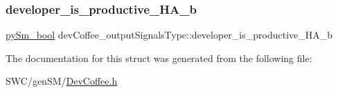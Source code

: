 \mbox{\label{structdevCoffee__outputSignalsType_a6fdb1443dc1eba7693a23eef24788d26}} 
\subsubsection{\texorpdfstring{developer\+\_\+is\+\_\+productive\+\_\+\+H\+A\+\_\+b}{developer\_is\_productive\_HA\_b}}
{\footnotesize\ttfamily \hyperlink{PySm__types_8h_a368133d64634d66410f3fe1343de6ba3}{py\+Sm\+\_\+bool} dev\+Coffee\+\_\+output\+Signals\+Type\+::developer\+\_\+is\+\_\+productive\+\_\+\+H\+A\+\_\+b}



The documentation for this struct was generated from the following file\+:\begin{DoxyCompactItemize}
\item 
S\+W\+C/gen\+S\+M/\hyperlink{DevCoffee_8h}{Dev\+Coffee.\+h}\end{DoxyCompactItemize}
